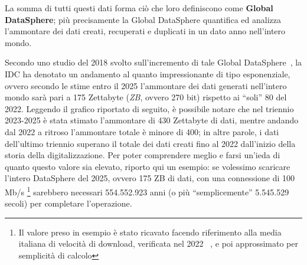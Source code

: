 La somma di tutti questi dati forma ciò che loro definiscono come \textbf{Global DataSphere}; più precisamente la Global DataSphere quantifica ed analizza l'ammontare dei dati creati, recuperati e duplicati in un dato anno nell'intero mondo.~\cite{datadrivendaily_dimension_table}

Secondo uno studio del 2018 svolto sull'incremento di tale Global DataSphere~\cite{idc_global_datasphere}, la IDC ha denotato un andamento al quanto impressionante di tipo esponenziale, ovvero secondo le stime entro il 2025 l'ammontare dei dati generati nell'intero mondo sarà pari a 175 Zettabyte (\textit{ZB}, ovvero 270 bit) rispetto ai “soli” 80 del 2022. Leggendo il grafico riportato di seguito, è possibile notare che nel triennio 2023-2025 è stata stimato l'ammontare di 430 Zettabyte di dati, mentre andando dal 2022 a ritroso l'ammontare totale è minore di 400; in altre parole, i dati dell'ultimo triennio superano il totale dei dati creati fino al 2022 dall'inizio della storia della digitalizzazione. Per poter comprendere meglio e farsi un'ieda di quanto questo valore sia elevato, riporto qui un esempio: se volessimo scaricare l'intero DataSphere del 2025, ovvero 175 ZB di dati, con una connessione di 100 Mb/s \footnote{Il valore preso in esempio è stato ricavato facendo riferimento alla media italiana di velocità di download, verificata nel 2022 ~\cite{github_speed_connection}, e poi approssimato per semplicità di calcolo} sarebbero necessari 554.552.923 anni (o più “semplicemente” 5.545.529 secoli) per completare l'operazione.

